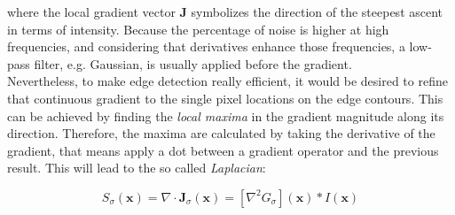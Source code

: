 where the local gradient vector $\mathbf{J}$ symbolizes the direction of the steepest ascent in terms of intensity. 
Because the percentage of noise is higher at high frequencies, and considering that derivatives enhance those frequencies, a low-pass filter, e.g. Gaussian, is usually applied before the gradient.\\
Nevertheless, to make edge detection really efficient, it would be desired to refine that continuous gradient to the single pixel locations on the edge contours. 
This can be achieved by finding the \textit{local maxima} in the gradient magnitude along its direction.
Therefore, the maxima are calculated by taking the derivative of the gradient, that means apply a dot between a gradient operator and the previous result.
This will lead to the so called \textit{Laplacian}:

\begin{equation}
	\label{eqn:laplacian}
	S_{\sigma}(\mathbf{x}) = \nabla \cdot \mathbf{J}_{\sigma}(\mathbf{x}) = [\nabla^2 G_{\sigma}](\mathbf{x}) \ast I(\mathbf{x})
\end{equation}

